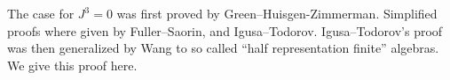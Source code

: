 The case for $J^3=0$ was first proved by Green--Huisgen-Zimmerman\cite[Theorem~16]{GZH91}. Simplified proofs where given by Fuller--Saorin\cite{FS92}, and Igusa--Todorov\cite[Corollary~6]{IgTo05}. Igusa--Todorov's proof was then generalized by Wang to so called ``half representation finite'' algebras\cite{Wang94}. We give this proof here.


		


